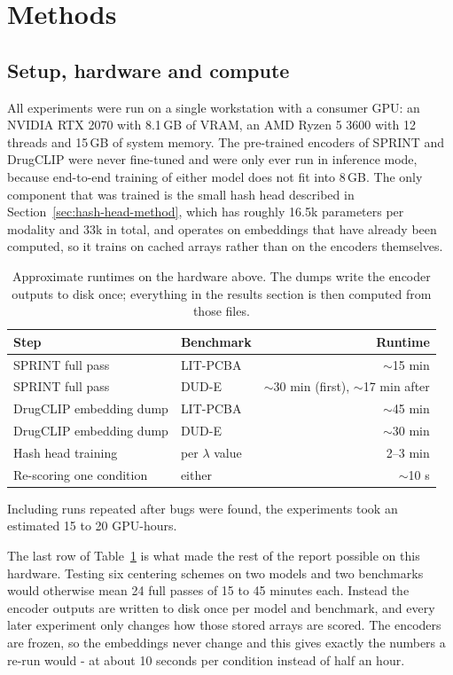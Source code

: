 \documentclass[10pt,a4paper]{article}
\begin{document}
\section{Methods}\label{sec:methods}

\subsection{Setup, hardware and compute}
All experiments were run on a single workstation with a consumer GPU: an NVIDIA RTX 2070 with
8.1\,GB of VRAM, an AMD Ryzen 5 3600 with 12 threads and 15\,GB of system memory. The
pre-trained encoders of SPRINT and DrugCLIP were never fine-tuned and were only ever run in
inference mode, because end-to-end training of either model does not fit into 8\,GB. The only
component that was trained is the small hash head described in Section~\ref{sec:hash-head-method}, which has roughly
16.5k parameters per modality and 33k in total, and operates on embeddings that have already been computed, so it
trains on cached arrays rather than on the encoders themselves.

\begin{table}[h]
\centering
\small
\caption{\label{tab:runtimes}Approximate runtimes on the hardware above. The dumps write the encoder outputs to
disk once; everything in the results section is then computed from those files.}
\begin{tabular}{llr}
\toprule
Step & Benchmark & Runtime \\
\midrule
SPRINT full pass & LIT-PCBA & $\sim$15 min \\
SPRINT full pass & DUD-E & $\sim$30 min (first), $\sim$17 min after \\
DrugCLIP embedding dump & LIT-PCBA & $\sim$45 min \\
DrugCLIP embedding dump & DUD-E & $\sim$30 min \\
Hash head training & per $\lambda$ value & 2--3 min \\
Re-scoring one condition & either & $\sim$10 s \\
\bottomrule
\end{tabular}
\end{table}

Including runs repeated after bugs were found, the experiments took an estimated 15 to 20
GPU-hours.

The last row of Table~\ref{tab:runtimes} is what made the rest of the report possible on this hardware. Testing
six centering schemes on two models and two benchmarks would otherwise mean 24 full passes of
15 to 45 minutes each. Instead the encoder outputs are written to disk once per model and
benchmark, and every later experiment only changes how those stored arrays are scored. The
encoders are frozen, so the embeddings never change and this gives exactly the numbers a
re-run would - at about 10 seconds per condition instead of half an hour.
\end{document}
